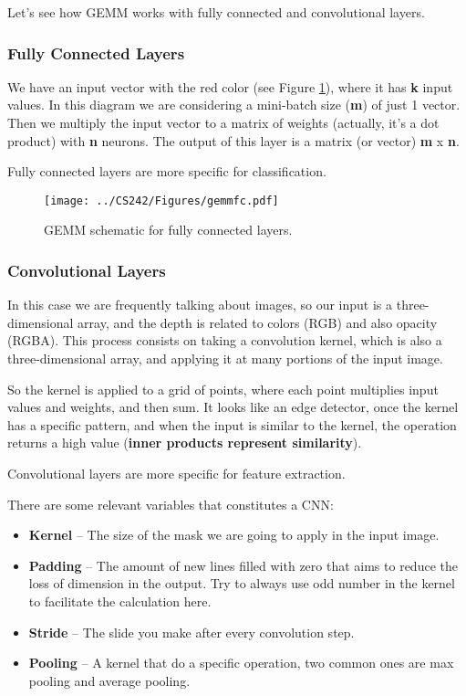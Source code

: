 \documentclass[abstract=true]{scrartcl}
\begin{document}
Let's see how GEMM works with fully connected and convolutional layers.

\subsubsection{Fully Connected Layers}
We have an input vector with the red color (see Figure \ref{fig:gemmfc}), where it has \textbf{k} input values. In this diagram we are considering a mini-batch size (\textbf{m}) of just 1 vector.
Then we multiply the input vector to a matrix of weights (actually, it's a dot product) with \textbf{n} neurons. The output of this layer is a matrix (or vector) \textbf{m} x \textbf{n}.

Fully connected layers are more specific for classification.
\begin{figure}
    \centering
    \texttt{[image: ../CS242/Figures/gemmfc.pdf]}
    \caption{GEMM schematic for fully connected layers.}
    \label{fig:gemmfc}
\end{figure}

\subsubsection{Convolutional Layers}
In this case we are frequently talking about images, so our input is a three-dimensional array, and the depth is related to colors (RGB) and also opacity (RGBA).
This process consists on taking a convolution kernel, which is also a three-dimensional array, and applying it at many portions of the input image. 

So the kernel is applied to a grid of points, where each point multiplies input values and weights, and then sum.
It looks like an edge detector, once the kernel has a specific pattern, and when the input is similar to the kernel, the operation returns a high value (\textbf{inner products represent similarity}).

Convolutional layers are more specific for feature extraction.

There are some relevant variables that constitutes a CNN:

\begin{itemize}
    \item \textbf{Kernel} -- The size of the mask we are going to apply in the input image.
    \item \textbf{Padding} -- The amount of new lines filled with zero that aims to reduce the loss of dimension in the output. Try to always use odd number in the kernel to facilitate the calculation here. 
    \item \textbf{Stride} -- The slide you make after every convolution step.
    \item \textbf{Pooling} -- A kernel that do a specific operation, two common ones are max pooling and average pooling.
\end{itemize}
\end{document}
